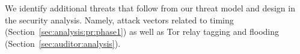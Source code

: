 %
%
We identify additional threats that follow from our threat model and design
in the security analysis.  Namely, attack vectors related to
	timing (Section~\ref{sec:analysis:pr:phase1}) as well as
	Tor relay tagging and flooding (Section~\ref{sec:auditor:analysis}).
